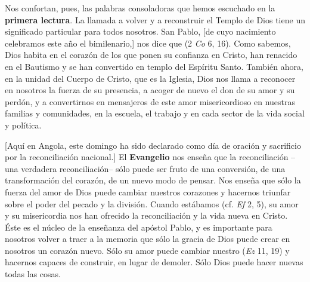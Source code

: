 \begin{body}
Nos confortan, pues, las palabras consoladoras que hemos escuchado en la \textbf{primera lectura}. La llamada a volver y a reconstruir el Templo de Dios tiene un significado particular para todos nosotros. San Pablo, [de cuyo nacimiento celebramos este año el bimilenario,] nos dice que  (2 \textit{Co} 6, 16). Como sabemos, Dios habita en el corazón de los que ponen su confianza en Cristo, han renacido en el Bautismo y se han convertido en templo del Espíritu Santo. También ahora, en la unidad del Cuerpo de Cristo, que es la Iglesia, Dios nos llama a reconocer en nosotros la fuerza de su presencia, a acoger de nuevo el don de su amor y su perdón, y a convertirnos en mensajeros de este amor misericordioso en nuestras familias y comunidades, en la escuela, el trabajo y en cada sector de la vida social y política.

[Aquí en Angola, este domingo ha sido declarado como día de oración y sacrificio por la reconciliación nacional.] El \textbf{Evangelio} nos enseña que la reconciliación –una verdadera reconciliación– sólo puede ser fruto de una conversión, de una transformación del corazón, de un nuevo modo de pensar. Nos enseña que sólo la fuerza del amor de Dios puede cambiar nuestros corazones y hacernos triunfar sobre el poder del pecado y la división. Cuando estábamos  (cf. \textit{Ef} 2, 5), su amor y su misericordia nos han ofrecido la reconciliación y la vida nueva en Cristo. Éste es el núcleo de la enseñanza del apóstol Pablo, y es importante para nosotros volver a traer a la memoria que sólo la gracia de Dios puede crear en nosotros un corazón nuevo. Sólo su amor puede cambiar nuestro  (\textit{Ez} 11, 19) y hacernos capaces de construir, en lugar de demoler. Sólo Dios puede hacer nuevas todas las cosas.



\end{body}
